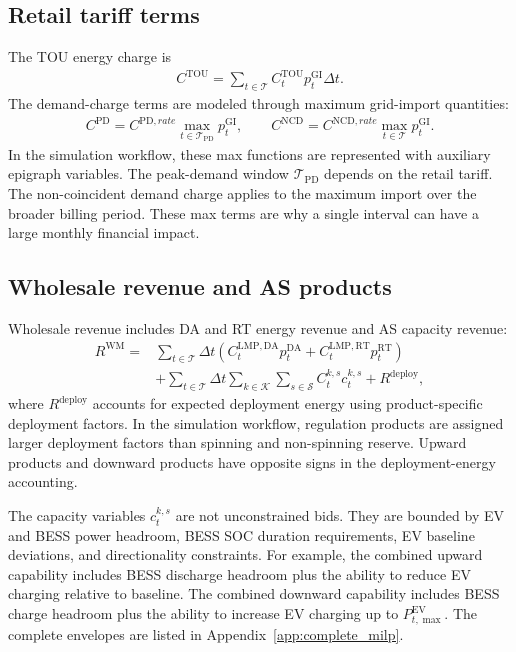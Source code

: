 \documentclass[final,5p,times]{elsarticle}
\newcommand{\DeltaT}{\Delta t}
\newcommand{\EV}{\mathrm{EV}}
\newcommand{\DA}{\mathrm{DA}}
\newcommand{\RT}{\mathrm{RT}}
\newcommand{\GI}{\mathrm{GI}}
\newcommand{\TOU}{\mathrm{TOU}}
\newcommand{\PD}{\mathrm{PD}}
\newcommand{\NCD}{\mathrm{NCD}}
\newcommand{\WM}{\mathrm{WM}}
\newcommand{\calT}{\mathcal{T}}
\newcommand{\calK}{\mathcal{K}}
\newcommand{\calS}{\mathcal{S}}
\begin{document}
\subsection{Retail tariff terms}
The TOU energy charge is
\begin{align}
C^{\TOU}=\sum_{t\in\calT} C_t^{\TOU}p_t^{\GI}\DeltaT.
\label{eq:tou_main}
\end{align}
The demand-charge terms are modeled through maximum grid-import quantities:
\begin{align}
C^{\PD}=C^{\PD,rate}\max_{t\in\calT_{\PD}} p_t^{\GI},\qquad
C^{\NCD}=C^{\NCD,rate}\max_{t\in\calT}p_t^{\GI}.
\label{eq:demand_charge_main}
\end{align}
In the simulation workflow, these max functions are represented with auxiliary epigraph variables. The peak-demand window $\calT_{\PD}$ depends on the retail tariff. The non-coincident demand charge applies to the maximum import over the broader billing period. These max terms are why a single interval can have a large monthly financial impact.

\subsection{Wholesale revenue and AS products}
Wholesale revenue includes DA and RT energy revenue and AS capacity revenue:
\begin{align}
R^{\WM}=&\sum_{t\in\calT}\DeltaT\left(C_t^{\mathrm{LMP},\DA}p_t^{\DA}+C_t^{\mathrm{LMP},\RT}p_t^{\RT}\right)\nonumber\\
&+\sum_{t\in\calT}\DeltaT\sum_{k\in\calK}\sum_{s\in\calS} C_t^{k,s}c_t^{k,s} + R^{\mathrm{deploy}},
\label{eq:wm_revenue_main}
\end{align}
where $R^{\mathrm{deploy}}$ accounts for expected deployment energy using product-specific deployment factors. In the simulation workflow, regulation products are assigned larger deployment factors than spinning and non-spinning reserve. Upward products and downward products have opposite signs in the deployment-energy accounting.

The capacity variables $c_t^{k,s}$ are not unconstrained bids. They are bounded by EV and BESS power headroom, BESS SOC duration requirements, EV baseline deviations, and directionality constraints. For example, the combined upward capability includes BESS discharge headroom plus the ability to reduce EV charging relative to baseline. The combined downward capability includes BESS charge headroom plus the ability to increase EV charging up to $P_{t,\max}^{\EV}$. The complete envelopes are listed in Appendix~\ref{app:complete_milp}.
\end{document}
